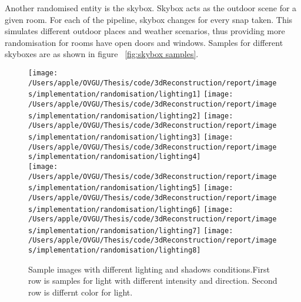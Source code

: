 Another randomised entity is the skybox.
Skybox acts as the outdoor scene for a given room.
For each of the pipeline, skybox changes for every snap taken.
This simulates different outdoor places and weather scenarios, thus providing more randomisation for rooms have open doors and windows.
Samples for different skyboxes are as shown in figure ~\ref{fig:skybox samples}.


\begin{figure}
    \centering
        \texttt{[image: /Users/apple/OVGU/Thesis/code/3dReconstruction/report/images/implementation/randomisation/lighting1]}
        \texttt{[image: /Users/apple/OVGU/Thesis/code/3dReconstruction/report/images/implementation/randomisation/lighting2]}
        \texttt{[image: /Users/apple/OVGU/Thesis/code/3dReconstruction/report/images/implementation/randomisation/lighting3]}
        \texttt{[image: /Users/apple/OVGU/Thesis/code/3dReconstruction/report/images/implementation/randomisation/lighting4]}\\
    \vspace{0.1cm}
        \texttt{[image: /Users/apple/OVGU/Thesis/code/3dReconstruction/report/images/implementation/randomisation/lighting5]}
        \texttt{[image: /Users/apple/OVGU/Thesis/code/3dReconstruction/report/images/implementation/randomisation/lighting6]}
        \texttt{[image: /Users/apple/OVGU/Thesis/code/3dReconstruction/report/images/implementation/randomisation/lighting7]}
        \texttt{[image: /Users/apple/OVGU/Thesis/code/3dReconstruction/report/images/implementation/randomisation/lighting8]}\\
    \caption{Sample images with different lighting and shadows conditions.First row is samples for light with different intensity and direction. Second row is differnt color for light.}
    \label{fig:Lighting and shadows}
\end{figure}

